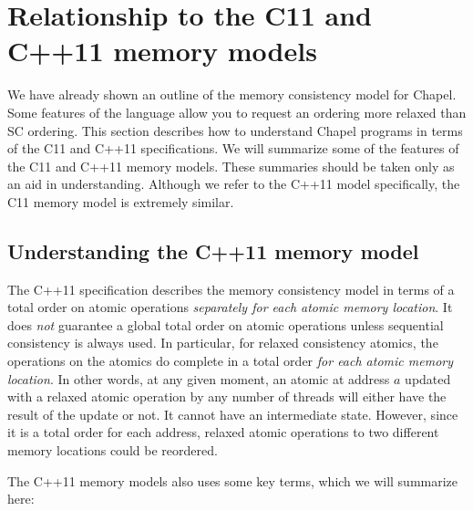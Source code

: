 \section{Relationship to the C11 and C++11 memory models}
\label{relating_to_C_MCM}

We have already shown an outline of the memory consistency model for Chapel.
Some features of the language allow you to request an ordering more relaxed than SC
ordering. This section describes how to understand Chapel programs in terms of
the C11 and C++11 specifications. We will summarize some of the features of the
C11 and C++11 memory models. These summaries should be taken only as an aid in
understanding. Although we refer to the C++11 model specifically, the C11
memory model is extremely similar.

\subsection{Understanding the C++11 memory model}

The C++11 specification describes the memory consistency model in terms of
a total order on atomic operations \textit{separately for each atomic
memory location}. It does \textit{not} guarantee a global total order
on atomic operations unless sequential consistency is always used. In
particular, for relaxed consistency atomics, the operations on the atomics
do complete in a total order \textit{for each atomic memory location}.  In
other words, at any given moment, an atomic at address $a$ updated with a
relaxed atomic operation by any number of threads will either have the
result of the update or not. It cannot have an intermediate state.
However, since it is a total order for each address, relaxed atomic
operations to two different memory locations could be reordered.

The C++11 memory models also uses some key terms, which we will summarize here:

